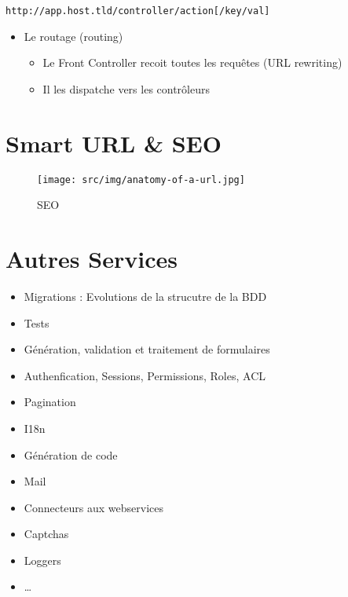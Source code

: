 \begin{english}

\begin{verbatim}
http://app.host.tld/controller/action[/key/val]
\end{verbatim}

\end{english}

\begin{itemize}
\tightlist
\item
  Le routage (routing)

  \begin{itemize}
  \tightlist
  \item
    Le Front Controller recoit toutes les requêtes (URL rewriting)
  \item
    Il les dispatche vers les contrôleurs
  \end{itemize}
\end{itemize}

\hypertarget{smart-url-seo}{%
\section{Smart URL \& SEO}\label{smart-url-seo}}

\begin{figure}
\centering
\texttt{[image: src/img/anatomy-of-a-url.jpg]}
\caption{SEO}
\end{figure}

\hypertarget{autres-services}{%
\section{Autres Services}\label{autres-services}}

\begin{itemize}
\tightlist
\item
  Migrations : Evolutions de la strucutre de la BDD
\item
  Tests
\item
  Génération, validation et traitement de formulaires
\item
  Authenfication, Sessions, Permissions, Roles, ACL
\item
  Pagination
\item
  I18n
\item
  Génération de code
\item
  Mail
\item
  Connecteurs aux webservices
\item
  Captchas
\item
  Loggers
\item
  \ldots{}
\end{itemize}

